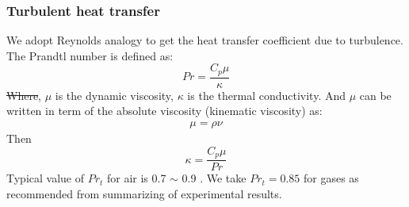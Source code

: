 \documentclass[gmd, manuscript]{copernicus} %
\providecommand{\DIFadd}[1]{{\protect\color{blue}\uwave{#1}}} %
\providecommand{\DIFdel}[1]{{\protect\color{red}\sout{#1}}}                      %
\providecommand{\DIFaddbegin}{} %
\providecommand{\DIFaddend}{} %
\providecommand{\DIFdelbegin}{} %
\providecommand{\DIFdelend}{} %
\begin{document}
\subsubsection{Turbulent heat transfer}
We adopt Reynolds analogy to get the heat transfer coefficient due to turbulence.
The Prandtl number is defined as:
\begin{equation}
Pr=\dfrac{C_p \mu}{\kappa}
\end{equation}
\DIFdelbegin \DIFdel{Where}\DIFdelend \DIFaddbegin \DIFadd{where}\DIFaddend , $\mu$ is the dynamic viscosity, $\kappa$ is the thermal conductivity. And $\mu$  can be written in term of the absolute viscosity (kinematic viscosity) as:
\begin{align}
\mu=\rho \nu
\end{align}
Then
\begin{equation}
\kappa=\dfrac{C_p \mu}{Pr}
\end{equation}
Typical value of $Pr_t$ for air is 0.7 $\sim$ 0.9 . We take $Pr_t=0.85$ for gases as recommended \citet{kays1994turbulent} from summarizing of experimental results. 
\end{document}

